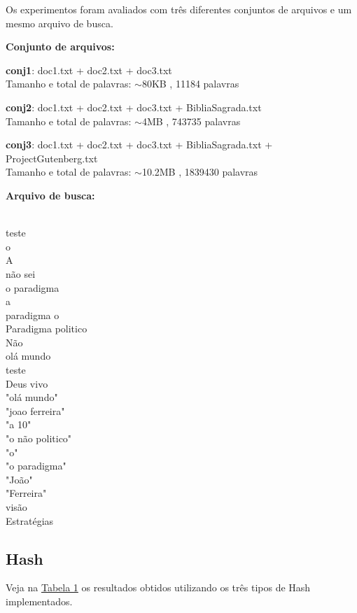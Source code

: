 \documentclass[
	11pt,				%
	oneside,			%
	a4paper,			%
	english,			%
	brazil,				%
	]{article}
\begin{document}
Os experimentos foram avaliados com três diferentes conjuntos de arquivos e um mesmo arquivo de busca.

\textbf{Conjunto de arquivos:}

\textbf{conj1}: doc1.txt + doc2.txt + doc3.txt \\
\indent Tamanho e total de palavras: $\sim$80KB , 11184 palavras

\textbf{conj2}: doc1.txt + doc2.txt + doc3.txt + BibliaSagrada.txt \\
\indent Tamanho e total de palavras: $\sim$4MB , 743735 palavras

\textbf{conj3}: doc1.txt + doc2.txt + doc3.txt + BibliaSagrada.txt + ProjectGutenberg.txt \\
\indent Tamanho e total de palavras: $\sim$10.2MB , 1839430 palavras

\textbf{Arquivo de busca:}

\begin{multicols}{2}
 \\
\indent teste \\
\indent o \\
\indent A \\
\indent não sei \\
\indent o paradigma \\
 a \\
\indent paradigma o \\
\indent Paradigma politico \\
\indent Não \\
\indent olá mundo \\
\indent teste \\
\indent Deus vivo \\
\indent "olá mundo" \\
\indent "joao ferreira" \\
\indent "a 10" \\
\indent "o não politico" \\
\indent "o" \\
\indent "o paradigma" \\
\indent "João" \\
\indent "Ferreira" \\
\indent visão \\
\indent Estratégias \\
\end{multicols}

\subsection{Hash}
Veja na \hyperlink{t1}{Tabela 1} os resultados obtidos utilizando os três tipos de Hash implementados.
\end{document}
